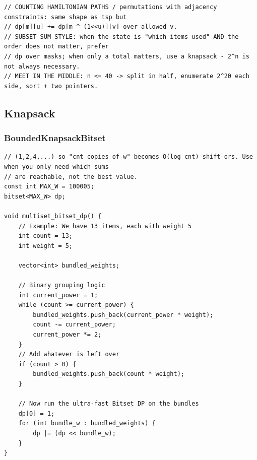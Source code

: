 \documentclass[9pt,a4paper,twocolumn]{extarticle}
\begin{document}
\begin{lstlisting}
// COUNTING HAMILTONIAN PATHS / permutations with adjacency constraints: same shape as tsp but
// dp[m][u] += dp[m ^ (1<<u)][v] over allowed v.
// SUBSET-SUM STYLE: when the state is "which items used" AND the order does not matter, prefer
// dp over masks; when only a total matters, use a knapsack - 2^n is not always necessary.
// MEET IN THE MIDDLE: n <= 40 -> split in half, enumerate 2^20 each side, sort + two pointers.
\end{lstlisting}

\subsection{Knapsack}

\filbreak
\subsubsection{BoundedKnapsackBitset}
\nopagebreak
\begin{lstlisting}
// (1,2,4,...) so "cnt copies of w" becomes O(log cnt) shift-ors. Use when you only need which sums
// are reachable, not the best value.
const int MAX_W = 100005;
bitset<MAX_W> dp;

void multiset_bitset_dp() {
    // Example: We have 13 items, each with weight 5
    int count = 13;
    int weight = 5;
    
    vector<int> bundled_weights;
    
    // Binary grouping logic
    int current_power = 1;
    while (count >= current_power) {
        bundled_weights.push_back(current_power * weight);
        count -= current_power;
        current_power *= 2;
    }
    // Add whatever is left over
    if (count > 0) {
        bundled_weights.push_back(count * weight);
    }
    
    // Now run the ultra-fast Bitset DP on the bundles
    dp[0] = 1;
    for (int bundle_w : bundled_weights) {
        dp |= (dp << bundle_w);
    }
}
\end{lstlisting}

\filbreak
\end{document}
